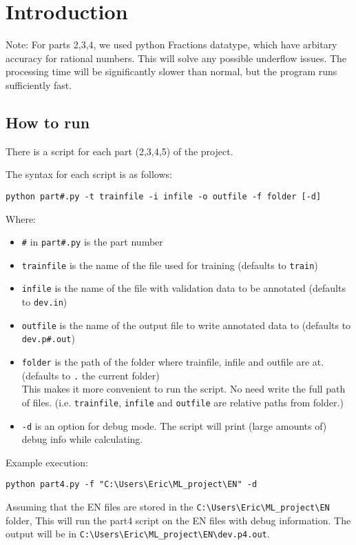 \documentclass[12pt]{article}
\begin{document}
\maketitle

\section{Introduction}

Note: For parts 2,3,4, we used python Fractions datatype, which have arbitary accuracy for rational numbers. This will solve any possible underflow issues. The processing time will be significantly slower than normal, but the program runs sufficiently fast.

\subsection{How to run}
There is a script for each part (2,3,4,5) of the project.

The syntax for each script is as follows:

\begin{verbatim}
python part#.py -t trainfile -i infile -o outfile -f folder [-d]
\end{verbatim}
Where:
\begin{itemize}
\item \texttt{\#} in \texttt{part\#.py} is the part number
\item \texttt{trainfile} is the name of the file used for training (defaults to \texttt{train})
\item \texttt{infile} is the name of the file with validation data to be annotated (defaults to \texttt{dev.in})
\item \texttt{outfile} is the name of the output file to write annotated data to (defaults to \texttt{dev.p\#.out})
\item \texttt{folder} is the path of the folder where trainfile, infile and outfile are at. (defaults to \texttt{.} the current folder) \\
This makes it more convenient to run the script. No need write the full path of files. (i.e. \texttt{trainfile}, \texttt{infile} and \texttt{outfile} are relative paths from folder.)
\item \texttt{-d} is an option for debug mode. The script will print (large amounts of) debug info while calculating.
\end{itemize}

Example execution:
\begin{verbatim}
python part4.py -f "C:\Users\Eric\ML_project\EN" -d
\end{verbatim}
Assuming that the EN files are stored in the \verb|C:\Users\Eric\ML_project\EN| folder, This will run the part4 script on the EN files with debug information. The output will be in \verb|C:\Users\Eric\ML_project\EN\dev.p4.out|.
\end{document}
